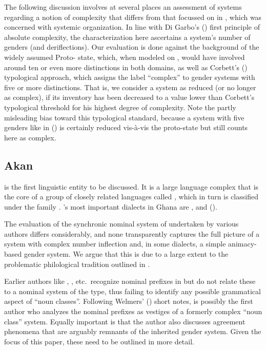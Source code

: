\documentclass[output=collectionpaper]{langsci/langscibook}
\begin{document}
The following discussion involves at several places an assessment of  systems regarding a notion of complexity that differs from that focussed on in , which was concerned with systemic organization. In line with Di Garbo's (\citeyear[41, 179]{DiGarbo2014}) first principle of absolute complexity, the characterization here ascertains a system's number of genders (and deriflections). Our evaluation is done against the background of the widely assumed Proto- state, which, when modeled on , would have involved around ten or even more distinctions in both domains, as well as Corbett's (\citeyear{Corbett2013}) typological approach, which assigns the label ``complex'' to gender systems with five or more distinctions. That is, we consider a  system as reduced (or no longer as complex), if its inventory has been decreased to a value lower than Corbett's typological threshold for his highest degree of complexity. Note the partly misleading bias toward this typological standard, because a system with five genders like in  () is certainly reduced vis-à-vis the proto-state but still counts here as complex.


\subsection{Akan}
\label{sec:Gueld:3.2}

 is the first linguistic entity to be discussed. It is a large language complex that is the core of a group of closely related languages called , which in turn is classified under the  family \citep{Stewart2002}. 's most important dialects in Ghana are ,  and  (\citealt[57]{Dolphyne1988}).

The evaluation of the synchronic nominal system of  undertaken by various authors differs considerably, and none transparently captures the full picture of a system with complex number inflection and, in some dialects, a simple animacy-based gender system. We argue that this is due to a large extent to the problematic philological  tradition outlined in .

Earlier authors like \citet{Christaller1875}, \citet{Dolphyne1988}, etc.\ recognize nominal prefixes in  but do not relate these to a nominal system of the  type, thus failing to identify any possible grammatical aspect of ``noun classes''. Following Welmers' (\citeyear[4--5]{Welmers1971}) short notes, \citet{Osam1993} is possibly the first author who analyzes the nominal prefixes as vestiges of a formerly complex ``noun class'' system. Equally important is that the author also discusses agreement phenomena that are arguably remnants of the inherited  gender system. Given the focus of this paper, these need to be outlined in more detail.
\end{document}
